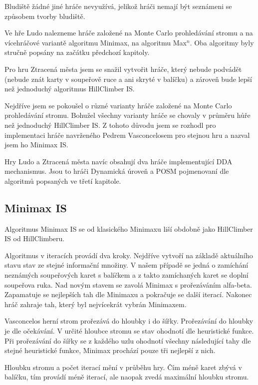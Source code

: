 Bludiště žádné jiné hráče nevyužívá, jelikož hráči nemají být seznámeni se způsobem tvorby bludiště.

Ve hře Ludo nalezneme hráče založené na Monte Carlo prohledávání stromu a na vícehráčové variantě algoritmu Minimax, na algoritmu Max$^n$. Oba algoritmy byly stručně popsány na začátku předchozí kapitoly.

Pro hru Ztracená města jsem se snažil vytvořit hráče, který nebude podvádět (nebude znát karty v soupeřově ruce a ani skryté v balíčku) a zároveň bude lepší než jednoduchý algoritmus HillClimber IS.

Nejdříve jsem se pokoušel o různé varianty hráče založené na Monte Carlo prohledávání stromu. Bohužel všechny varianty hráče se chovaly v průměru hůře než jednoduchý HillClimber IS. Z tohoto důvodu jsem se rozhodl pro implementaci hráče navrženého Pedrem Vasconcelosem \cite{ch5LT} pro stejnou hru a nazval jsem ho Minimax IS.

Hry Ludo a Ztracená města navíc obsahují dva hráče implementující DDA mechanismus. Jsou to hráči Dynamická úroveň a POSM pojmenovaní dle algoritmů popsaných ve třetí kapitole.

\subsection{Minimax IS}

Algoritmus Minimax IS se od klasického Minimaxu liší obdobně jako HillClimber IS od HillClimberu. 

Algoritmus v iteracích provádí dva kroky. Nejdříve vytvoří na základě aktuálního stavu stav ze stejné informační množiny. V našem případě se jedná o zamíchání neznámých soupeřových karet s balíčkem a z takto zamíchaných karet se doplní soupeřova ruka. Nad novým stavem se zavolá Minimax s prořezáváním alfa-beta. Zapamatuje se nejlepších tah dle Minimaxu a pokračuje se další iterací. Nakonec hráč zahraje tah, který byl nejvícekrát vybrán Minimaxem.

Vasconcelos herní strom prořezává do hloubky i do šířky. Prořezávání do hloubky je dle očekávání. V určité hloubce stromu se stav ohodnotí dle heuristické funkce. Při prořezávání do šířky se z každého uzlu ohodnotí všechny následující tahy dle stejné heuristické funkce, Minimax prochází pouze tři nejlepší z nich.

Hloubku stromu a počet iterací mění v průběhu hry. Čím méně karet zbývá v balíčku, tím provádí méně iterací, ale naopak zvedá maximální hloubku stromu.

